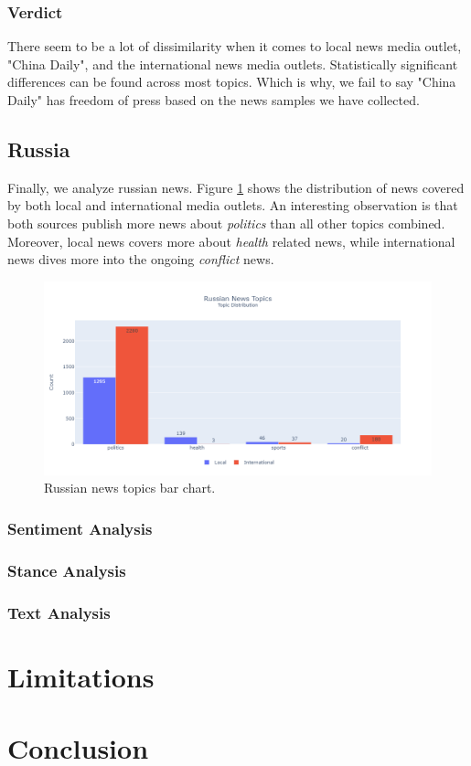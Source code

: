 \documentclass{article}
\theoremstyle{mytheoremstyle}
\theoremstyle{mytheoremstyle}
\theoremstyle{myproblemstyle}
\begin{document}
    \subsubsection{Verdict}

    There seem to be a lot of dissimilarity when it comes to local news media outlet, "China Daily", and the international news media outlets. Statistically significant differences can be found across most topics. Which is why, we fail to say "China Daily" has freedom of press based on the news samples we have collected.

    \subsection{Russia}

    Finally, we analyze russian news. Figure \ref{fig:russia_topic} shows the distribution of news covered by both local and international media outlets. An interesting observation is that both sources publish more news about \emph{politics} than all other topics combined. Moreover, local news covers more about \emph{health} related news, while international news dives more into the ongoing \emph{conflict} news.
    
    \begin{figure}[hp]
        \centering
        \includegraphics[width=\linewidth]{../images/plots/Russia/russia_barchart_topics.png}
        \caption{Russian news topics bar chart.}
        \label{fig:russia_topic}
    \end{figure}

    \subsubsection{Sentiment Analysis}

    \subsubsection{Stance Analysis}
    
    \subsubsection{Text Analysis}

    \section{Limitations}

    \section{Conclusion}

    
    

    
\end{document}

